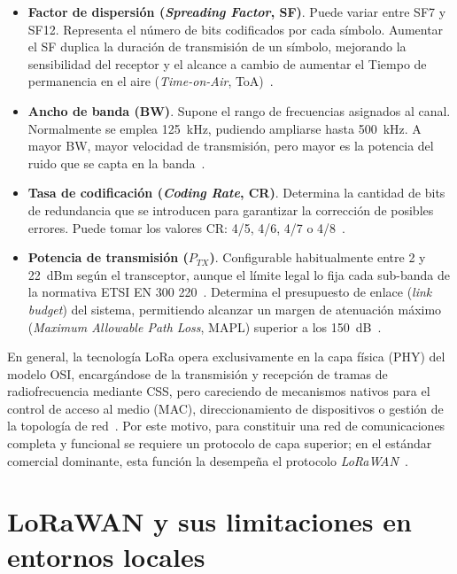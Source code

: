 \begin{itemize}
\item \textbf{Factor de dispersión (\textit{Spreading Factor}, SF)}. Puede variar entre SF7 y SF12. Representa el número de bits codificados por cada símbolo. Aumentar el SF duplica la duración de transmisión de un símbolo, mejorando la sensibilidad del receptor y el alcance a cambio de aumentar el Tiempo de permanencia en el aire (\textit{Time-on-Air}, ToA)~\cite{chaudhari2020lpwan}. 

\item \textbf{Ancho de banda (BW)}. Supone el rango de frecuencias asignados al canal. Normalmente se emplea 125~kHz, pudiendo ampliarse hasta 500~kHz. A mayor BW, mayor velocidad de transmisión, pero mayor es la potencia del ruido que se capta en la banda~\cite{devalal2018lora}.

\item \textbf{Tasa de codificación (\textit{Coding Rate}, CR)}. Determina la cantidad de bits de redundancia que se introducen para garantizar la corrección de posibles errores. Puede tomar los valores CR: 4/5, 4/6, 4/7 o 4/8~\cite{arregui2025gatewayfree}.

\item \textbf{Potencia de transmisión ($P_{TX}$)}. Configurable habitualmente entre 2 y 22~dBm según el transceptor, aunque el límite legal lo fija cada sub-banda de la normativa ETSI EN 300 220~\cite{etsien300F2202}. Determina el presupuesto de enlace (\textit{link budget}) del sistema, permitiendo alcanzar un margen de atenuación máximo (\textit{Maximum Allowable Path Loss}, MAPL) superior a los 150~dB~\cite{chaudhari2020lpwan}.
\end{itemize}

En general, la tecnología LoRa opera exclusivamente en la capa física (PHY) del modelo OSI, encargándose de la transmisión y recepción de tramas de radiofrecuencia mediante CSS, pero careciendo de mecanismos nativos para el control de acceso al medio (MAC), direccionamiento de dispositivos o gestión de la topología de red~\cite{arregui2025gatewayfree}. Por este motivo, para constituir una red de comunicaciones completa y funcional se requiere un protocolo de capa superior; en el estándar comercial dominante, esta función la desempeña el protocolo \textit{LoRaWAN}~\cite{devalal2018lora,sornin2015lorawan}.


\section{LoRaWAN y sus limitaciones en entornos locales}

